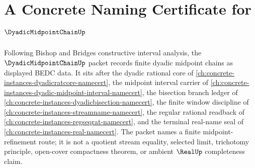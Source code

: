 \chapter{A Concrete Naming Certificate for $\DyadicMidpointChainUp$}
\label{ch:concrete-instances-dyadic-midpoint-chain-namecert}

Following Bishop and Bridges constructive interval analysis, the $\DyadicMidpointChainUp$ packet records finite dyadic midpoint chains as displayed BEDC data. It sits after the dyadic rational core of \autoref{ch:concrete-instances-dyadicratcore-namecert}, the midpoint interval carrier of \autoref{ch:concrete-instances-dyadic-midpoint-interval-namecert}, the bisection branch ledger of \autoref{ch:concrete-instances-dyadicbisection-namecert}, the finite window discipline of \autoref{ch:concrete-instances-streamname-namecert}, the regular rational readback of \autoref{ch:concrete-instances-regseqrat-namecert}, and the terminal real-name seal of \autoref{ch:concrete-instances-real-namecert}. The packet names a finite midpoint-refinement route; it is not a quotient stream equality, selected limit, trichotomy principle, open-cover compactness theorem, or ambient $\RealUp$ completeness claim.

